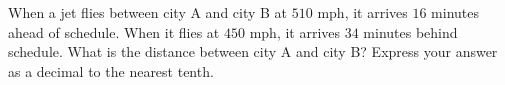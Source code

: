 When a jet flies between city A and city B at $510$ mph, it arrives $16$ minutes ahead of schedule. When it flies at $450$ mph, it arrives $34$ minutes behind schedule. What is the distance between city A and city B? Express your answer as a decimal to the nearest tenth.

